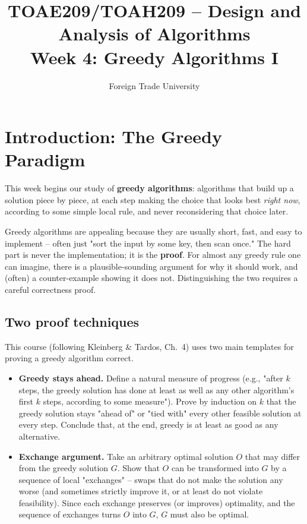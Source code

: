 \documentclass[11pt]{article}
\title{TOAE209/TOAH209 -- Design and Analysis of Algorithms\\[4pt]
\large Week 4: Greedy Algorithms I}
\author{Foreign Trade University}
\date{}
\begin{document}
\maketitle
\tableofcontents

\section{Introduction: The Greedy Paradigm}

This week begins our study of \textbf{greedy algorithms}: algorithms that build up a
solution piece by piece, at each step making the choice that looks best \emph{right now},
according to some simple local rule, and never reconsidering that choice later.

Greedy algorithms are appealing because they are usually short, fast, and easy to
implement -- often just "sort the input by some key, then scan once." The hard part is
never the implementation; it is the \textbf{proof}. For almost any greedy rule one can
imagine, there is a plausible-sounding argument for why it should work, and (often) a
counter-example showing it does not. Distinguishing the two requires a careful
correctness proof.

\subsection{Two proof techniques}

This course (following Kleinberg \& Tardos, Ch.\ 4) uses two main templates for proving a
greedy algorithm correct.

\begin{itemize}
    \item \textbf{Greedy stays ahead.} Define a natural measure of progress (e.g., "after
    $k$ steps, the greedy solution has done at least as well as any other algorithm's
    first $k$ steps, according to some measure"). Prove by induction on $k$ that the
    greedy solution stays "ahead of" or "tied with" every other feasible solution at every
    step. Conclude that, at the end, greedy is at least as good as any alternative.

    \item \textbf{Exchange argument.} Take an arbitrary optimal solution $O$ that may
    differ from the greedy solution $G$. Show that $O$ can be transformed into $G$ by a
    sequence of local "exchanges" -- swaps that do not make the solution any worse (and
    sometimes strictly improve it, or at least do not violate feasibility). Since each
    exchange preserves (or improves) optimality, and the sequence of exchanges turns $O$
    into $G$, $G$ must also be optimal.
\end{itemize}
\end{document}
